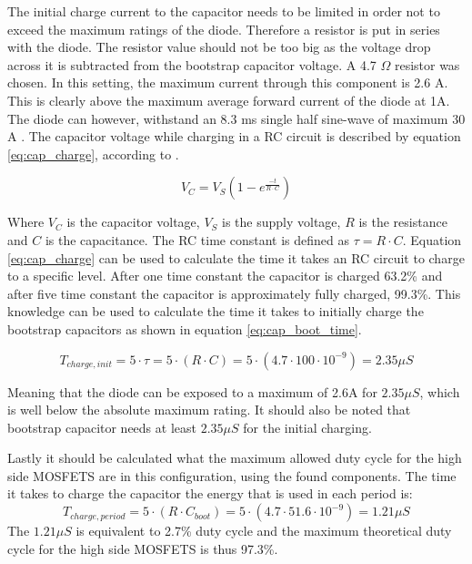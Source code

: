 The initial charge current to the capacitor needs to be limited in order not to exceed the maximum ratings of the diode.
Therefore a resistor is put in series with the diode.
The resistor value should not be too big as the voltage drop across it is subtracted from the bootstrap capacitor voltage.
A 4.7 $\Omega$ resistor was chosen. In this setting, the maximum current through this component is 2.6 A.
This is clearly above the maximum average forward current of the diode at 1A.
The diode can however, withstand an 8.3 ms single half sine-wave of maximum 30 A \cite{diode_ds}.
The capacitor voltage while charging in a RC circuit is described by equation \ref{eq:cap_charge}, according to \cite{prac_ele_for_inven}.

\begin{equation}
	V_C = V_S (1-e^{\frac{-t}{R\cdot C}})
	\label{eq:cap_charge}
\end{equation}

Where $V_C$ is the capacitor voltage, $V_S$ is the supply voltage, $R$ is the resistance and $C$ is the capacitance.
The RC time constant is defined as $\tau = R\cdot C$.
Equation \ref{eq:cap_charge} can be used to calculate the time it takes an RC circuit to charge to a specific level.
After one time constant the capacitor is charged 63.2\% and after five time constant the capacitor is approximately fully charged, 99.3\%.
This knowledge can be used to calculate the time it takes to initially charge the bootstrap capacitors as shown in equation \ref{eq:cap_boot_time}.

\begin{equation}
T_{charge,init} = 5\cdot \tau = 5\cdot (R \cdot C) = 5\cdot (4.7 \cdot 100 \cdot 10^{-9}) = 2.35 \mu S 
\label{eq:cap_boot_time}
\end{equation}

Meaning that the diode can be exposed to a maximum of 2.6A for $2.35 \mu S $, which is well below the absolute maximum rating.
It should also be noted that bootstrap capacitor needs at least $2.35 \mu S $ for the initial charging.

Lastly it should be calculated what the maximum allowed duty cycle for the high side MOSFETS are in this configuration, using the found components.
The time it takes to charge the capacitor the energy that is used in each period is:
\begin{equation}
	T_{charge,period} = 5\cdot (R \cdot C_{boot}) = 5\cdot (4.7 \cdot  51.6 \cdot 10^{-9}) = 1.21 \mu S 
\end{equation}
The $1.21 \mu S$ is equivalent to 2.7\% duty cycle and the maximum theoretical duty cycle for the high side MOSFETS is thus 97.3\%.


